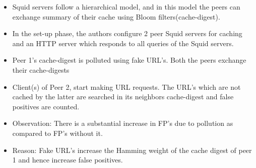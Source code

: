 \begin{itemize}
\item Squid servers follow a hierarchical model, and in this model the peers can exchange summary of their cache using Bloom filters(cache-digest). 
\item In the set-up phase, the authors configure 2 peer Squid servers for caching and an HTTP server which responds to all queries of the Squid servers. 
\item Peer 1's cache-digest is polluted using fake URL's. Both the peers exchange their cache-digests 
\item Client(s) of Peer 2, start making URL requests. The URL's which are not cached by the latter are searched in its neighbors cache-digest and false positives are counted.
\item Observation: There is a substantial increase in FP's due to pollution as compared to FP's without it.
\item Reason: Fake URL's increase the Hamming weight of the cache digest of peer 1 and hence increase false positives.
\end{itemize}

\fi
